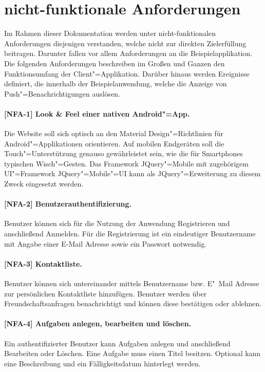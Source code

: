 \section{nicht-funktionale Anforderungen}
\label{sec_anforderungen_nicht-funktionale-anforderungen}

Im Rahmen dieser Dokumentation werden unter nicht-funktionalen Anforderungen diejenigen verstanden, welche nicht zur direkten Zielerfüllung beitragen. Darunter fallen vor allem Anforderungen an die Beispielapplikation. Die folgenden Anforderungen beschreiben im Großen und Ganzen den Funktionsumfang der Client"=Applikation. Darüber hinaus werden Ereignisse definiert, die innerhalb der Beispielanwendung, welche die Anzeige von Push"=Benachrichtigungen auslösen.

\paragraph{[NFA-1] Look \& Feel einer nativen Android"=App.} Die Website soll sich optisch an den \glqq Material Design\grqq "=Richtlinien für Android"=Applikationen orientieren. Auf mobilen Endgeräten soll die Touch"=Unterstützung genauso gewährleistet sein, wie die für Smartphones typischen Wisch"=Gesten. Das Framework \glqq JQuery"=Mobile\grqq{} mit zugehörigem UI"=Framework \glqq JQuery"=Mobile"=UI\grqq{} kann als JQuery"=Erweiterung zu diesem Zweck eingesetzt werden.

\paragraph{[NFA-2] Benutzerauthentifizierung.} Benutzer können sich für die Nutzung der Anwendung Registrieren und anschließend Anmelden. Für die Registrierung ist ein eindeutiger Benutzername mit Angabe einer E-Mail Adresse sowie ein Passwort notwendig.

\paragraph{[NFA-3] Kontaktliste.} Benutzer können sich untereinander mittels Benutzername bzw. E"~Mail Adresse zur persönlichen Kontaktliste hinzufügen. Benutzer werden über Freundschaftsanfragen benachrichtigt und können diese bestätigen oder ablehnen.

\paragraph{[NFA-4] Aufgaben anlegen, bearbeiten und löschen.} Ein authentifizierter Benutzer kann Aufgaben anlegen und anschließend Bearbeiten oder Löschen. Eine Aufgabe muss einen Titel besitzen. Optional kann eine Beschreibung und ein Fälligkeitsdatum hinterlegt werden.

